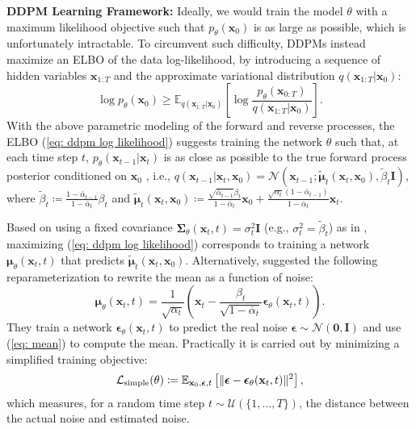 \noindent\textbf{DDPM Learning Framework:} Ideally, we would train the model $\theta$ with a maximum likelihood objective such that $p_\theta(\mathbf{x}_0)$ is as large as possible, which is unfortunately intractable. To circumvent such difficulty, DDPMs \citep{ho2020denoising} instead maximize an ELBO of the data log-likelihood, by introducing a sequence of hidden variables $\mathbf{x}_{1:T}$ and the approximate variational distribution $q(\mathbf{x}_{1:T}|\mathbf{x}_0)$: 
\begin{equation}
    \log p_\theta(\mathbf{x}_0)\geq\mathbb{E}_{q(\mathbf{x}_{1:T}|\mathbf{x}_0)}\left[\log\frac{p_\theta({\mathbf{x}_{0:T}})}{q(\mathbf{x}_{1:T}|\mathbf{x}_0)}\right].
\label{eq: ddpm log likelihood}
\end{equation}
With the above parametric modeling of the forward and reverse processes, the ELBO (\ref{eq: ddpm log likelihood}) suggests training the network $\theta$ such that, at each time step $t$, $p_\theta(\mathbf{x}_{t-1}|\mathbf{x}_t)$ is as close as possible to the true forward process posterior conditioned on $\mathbf{x}_0$ \citep{luo2022understanding,croitoru2023diffusion}, i.e., $q(\mathbf{x}_{t-1}|\mathbf{x}_t,\mathbf{x}_0)=\mathcal{N}(\mathbf{x}_{t-1};\tilde{\boldsymbol{\mu}}_t(\mathbf{x}_t,\mathbf{x}_0),\tilde{\beta}_t\mathbf{I})$,
where $\tilde{\beta}_t\coloneq\frac{1-\bar{\alpha}_{t-1}}{1-\bar{\alpha}_t}\beta_t$ and  $\tilde{\boldsymbol{\mu}}_t(\mathbf{x}_t,\mathbf{x}_0)\coloneq\frac{\sqrt{\bar{\alpha}_{t-1}}\beta_t}{1-\bar{\alpha}_t}\mathbf{x}_0+\frac{\sqrt{\alpha_t}(1-\bar{\alpha}_{t-1})}{1-\bar{\alpha}_t}\mathbf{x}_t$.

Based on using a fixed covariance $\boldsymbol{\Sigma}_\theta(\mathbf{x}_t,t)=\sigma_t^2\mathbf{I}$ (e.g., $\sigma_t^2=\tilde{\beta}_t$) as in \citet{ho2020denoising}, maximizing (\ref{eq: ddpm log likelihood}) corresponds to training a network $\boldsymbol{\mu}_\theta(\mathbf{x}_t,t)$ that predicts $\tilde{\boldsymbol{\mu}}_t(\mathbf{x}_t,\mathbf{x}_0)$. Alternatively, \citet{ho2020denoising} suggested the following reparameterization to rewrite the mean as a function of noise: 
\begin{equation}
       \boldsymbol{\mu}_\theta(\mathbf{x}_t,t)=\frac{1}{\sqrt{\alpha_t}}\left(\mathbf{x}_t-\frac{\beta_t}{\sqrt{1-\bar{\alpha}_t}}\boldsymbol{\epsilon}_\theta(\mathbf{x}_t,t)\right).
\label{eq: mean}
\end{equation}
They train a network $\boldsymbol{\epsilon}_\theta(\mathbf{x}_t,t)$ to predict the real noise $\boldsymbol{\epsilon}\sim\mathcal{N}(\mathbf{0},\mathbf{I})$ and use (\ref{eq: mean}) to compute the mean. Practically it is carried out by minimizing a simplified training objective: 
\begin{equation}
    \mathcal{L}_{\text{simple}}(\theta)\coloneq\mathbb{E}_{\mathbf{x}_0,\boldsymbol{\epsilon},t}\left[\lVert\boldsymbol{\epsilon}-\boldsymbol{\epsilon}_\theta(\mathbf{x}_t, t)\rVert^2\right],
\label{eq: ddpm loss simple}
\end{equation}
which measures, for a random time step $t\sim\mathcal{U}(\{1,\dots,T\})$, the distance between the actual noise and estimated noise.

